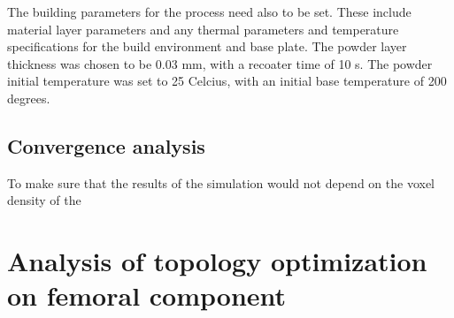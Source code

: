 \documentclass{article}
\begin{document}
The building parameters for the process need also to be set. These include material layer parameters and any thermal parameters and temperature specifications for the build environment and base plate. The powder layer thickness was chosen to be 0.03 mm, with a recoater time of 10 s. The powder initial temperature was set to 25 \degree Celcius, with an initial base temperature of 200 degrees. 



\subsection{Convergence analysis}

To make sure that the results of the simulation would not depend on the voxel density of the 



\section{Analysis of topology optimization on femoral component}

\listoftodos
\end{document}
